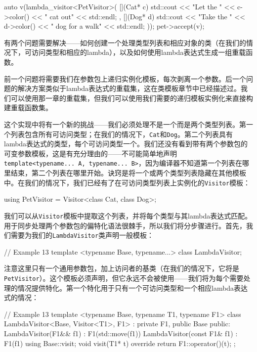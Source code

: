 \begin{code}
{\begin{code}
auto v(lambda_visitor<PetVisitor>(
  [](Cat* c) { std::cout << "Let the " << c->color()
                         << " cat out" << std::endl;
  },
  [](Dog* d) { std::cout << "Take the " << d->color()
                         << " dog for a walk" << std::endl;
  }
));
pet->accept(v);
\end{code}

有两个问题需要解决——如何创建一个处理类型列表和相应对象的类（在我们的情况下，可访问类型和相应的lambda），以及如何使用lambda表达式生成一组重载函数。

前一个问题将需要我们在参数包上递归实例化模板，每次剥离一个参数。后一个问题的解决方案类似于lambda表达式的重载集，这在类模板章节中已经描述过。我们可以使用那一章的重载集，但我们可以使用我们需要的递归模板实例化来直接构建重载函数集。

这个实现中将有一个新的挑战——我们必须处理不是一个而是两个类型列表。第一个列表包含所有可访问类型；在我们的情况下，\texttt{Cat}和\texttt{Dog}。第二个列表具有lambda表达式的类型，每个可访问类型一个。我们还没有看到带有两个参数包的可变参数模板，这是有充分理由的——不可能简单地声明\texttt{template\textless{}typename...\ A,\ typename...\ B\textgreater{}}，因为编译器不知道第一个列表在哪里结束，第二个列表在哪里开始。诀窍是将一个或两个类型列表隐藏在其他模板中。在我们的情况下，我们已经有了在可访问类型列表上实例化的\texttt{Visitor}模板：

\begin{code}
using PetVisitor = Visitor<class Cat, class Dog>;
\end{code}

我们可以从\texttt{Visitor}模板中提取这个列表，并将每个类型与其lambda表达式匹配。用于同步处理两个参数包的偏特化语法很棘手，所以我们将分步骤进行。首先，我们需要为我们的\texttt{LambdaVisitor}类声明一般模板：

\begin{code}
// Example 13
template <typename Base, typename...>
class LambdaVisitor;
\end{code}

注意这里只有一个通用参数包，加上访问者的基类（在我们的情况下，它将是\texttt{PetVisitor}）。这个模板必须声明，但它永远不会被使用——我们将为每个需要处理的情况提供特化。第一个特化用于只有一个可访问类型和一个相应lambda表达式的情况：

\begin{code}
// Example 13
template <typename Base, typename T1, typename F1>
class LambdaVisitor<Base, Visitor<T1>, F1> :
  private F1, public Base
{
  public:
  LambdaVisitor(F1&& f1) : F1(std::move(f1)) {}
  LambdaVisitor(const F1& f1) : F1(f1) {}
  using Base::visit;
  void visit(T1* t) override { return F1::operator()(t); }
};
\end{code}

}
\end{code}
